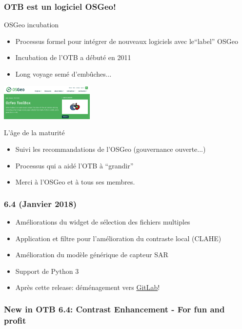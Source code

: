 \documentclass[8pt]{beamer}
\begin{document}
\begin{frame}
  \frametitle{OTB est un logiciel OSGeo!}
  \begin{block}{OSGeo incubation}
    \begin{itemize}
      \item Processus formel pour intégrer de nouveaux logiciels avec le``label'' OSGeo
      \item Incubation de l'OTB a débuté en 2011
      \item Long voyage semé d'embûches...
    \end{itemize}
  \end{block}
  \begin{center}
  \includegraphics[width=0.35\textwidth]{images/osgeo-otb-website.png}
  \end{center}
  \begin{block}{L'âge de la maturité}
    \begin{itemize}
      \item Suivi les recommandations de l'OSGeo (gouvernance ouverte...)
      \item Processus qui a aidé l'OTB à ``grandir''
      \item Merci à l'OSGeo et à tous ses membres.
    \end{itemize}
  \end{block}
  
\end{frame}

\begin{frame}
  \frametitle{6.4 (Janvier 2018)}
  \begin{itemize}
  \item Améliorations du widget de sélection des fichiers multiples
  \item Application et filtre pour l'amélioration du contraste local (CLAHE)
  \item Amélioration du modèle générique de capteur SAR
  \item Support de Python 3
  \item Après cette release: déménagement vers \href{https://gitlab.orfeo-toolbox.org}{GitLab}!
  \end{itemize}
\end{frame}

\begin{frame}
  \frametitle{New in OTB 6.4: Contrast Enhancement - For fun and profit}
\end{frame}
    
\end{document}
